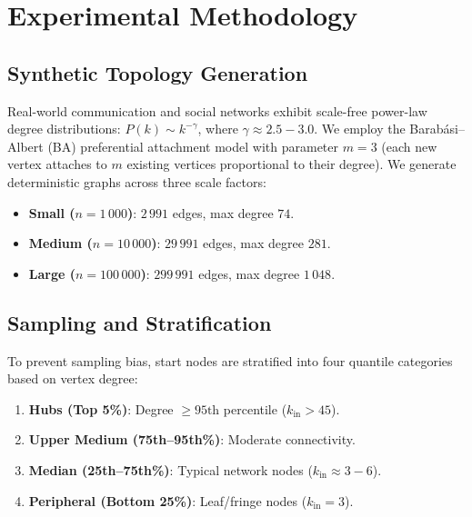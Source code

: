 \documentclass[conference,10pt]{IEEEtran}%
\begin{document}
\section{Experimental Methodology}

\subsection{Synthetic Topology Generation}
Real-world communication and social networks exhibit scale-free power-law degree distributions: $P(k) \sim k^{-\gamma}$, where $\gamma \approx 2.5 - 3.0$.
We employ the Barab\'asi--Albert (BA) preferential attachment model with parameter $m=3$ (each new vertex attaches to $m$ existing vertices proportional to their degree). We generate deterministic graphs across three scale factors:
\begin{itemize}
    \item \textbf{Small ($n = 1\,000$)}: $2\,991$ edges, max degree $74$.
    \item \textbf{Medium ($n = 10\,000$)}: $29\,991$ edges, max degree $281$.
    \item \textbf{Large ($n = 100\,000$)}: $299\,991$ edges, max degree $1\,048$.
\end{itemize}

\subsection{Sampling and Stratification}
To prevent sampling bias, start nodes are stratified into four quantile categories based on vertex degree:
\begin{enumerate}
    \item \textbf{Hubs (Top 5\%)}: Degree $\ge 95\text{th}$ percentile ($k_{\text{in}} > 45$).
    \item \textbf{Upper Medium (75th--95th\%)}: Moderate connectivity.
    \item \textbf{Median (25th--75th\%)}: Typical network nodes ($k_{\text{in}} \approx 3 - 6$).
    \item \textbf{Peripheral (Bottom 25\%)}: Leaf/fringe nodes ($k_{\text{in}} = 3$).
\end{enumerate}
\end{document}
